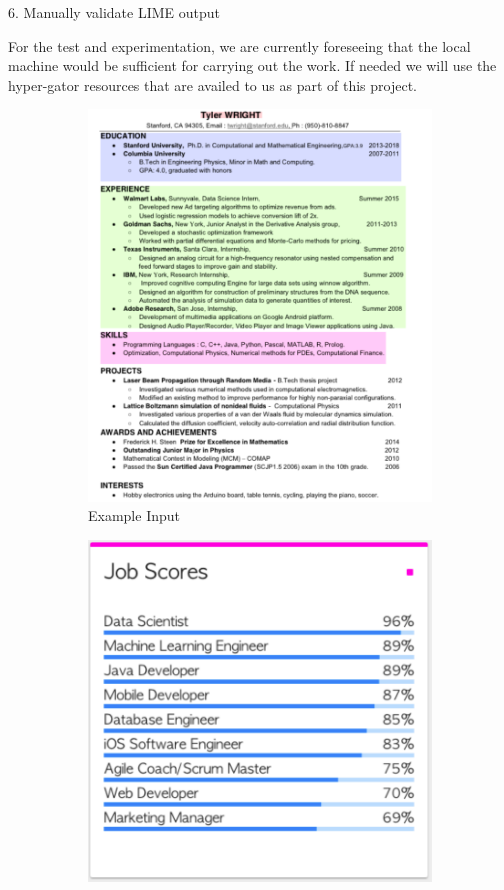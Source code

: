 \documentclass[11pt,letterpaper]{article}
\begin{document}
6. Manually validate LIME output


For the test and experimentation, we are currently foreseeing that the local machine would be sufficient for carrying out the work. If needed we will use the hyper-gator resources that are availed to us as part of this project. 

\begin{figure}[h!]
	\centering
	\begin{subfigure}[b]{0.45\linewidth}
		\includegraphics[width=\linewidth]{images/resume.png}
		\caption{Example Input}
	\end{subfigure}
	\begin{subfigure}[b]{0.45\linewidth}
		\includegraphics[width=\linewidth]{images/job_title.png}

\end{subfigure}
\end{figure}
\end{document}
